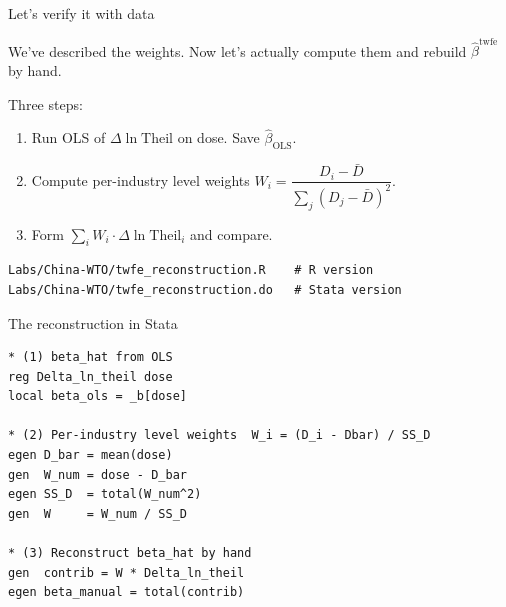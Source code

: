 \documentclass[aspectratio=169,12pt,t]{beamer}
\begin{document}
\begin{frame}[fragile]{Let's verify it with data}
\vspace{0.4em}

We've described the weights. \;Now let's actually compute them and rebuild $\widehat\beta^{\text{twfe}}$ by hand.

\vspace{0.8em}

Three steps:
\begin{enumerate}\setlength\itemsep{0.3em}
  \item Run OLS of $\Delta\ln\text{Theil}$ on dose. \;Save $\widehat\beta_{\text{OLS}}$.
  \item Compute per-industry level weights $W_i = \dfrac{D_i - \bar D}{\sum_j (D_j - \bar D)^2}$.
  \item Form $\sum_i W_i \cdot \Delta\ln\text{Theil}_i$ and compare.
\end{enumerate}

\vspace{0.5em}
\begin{center}
\end{center}

\vspace{0.5em}
\begin{lstlisting}[basicstyle=\ttfamily\tiny\color{warmgray},frame=none,backgroundcolor=\color{white}]
Labs/China-WTO/twfe_reconstruction.R    # R version
Labs/China-WTO/twfe_reconstruction.do   # Stata version
\end{lstlisting}
\end{frame}

\begin{frame}[fragile]{The reconstruction in Stata}
\footnotesize
\begin{lstlisting}[language={[ANSI]C},basicstyle=\ttfamily\scriptsize]
* (1) beta_hat from OLS
reg Delta_ln_theil dose
local beta_ols = _b[dose]

* (2) Per-industry level weights  W_i = (D_i - Dbar) / SS_D
egen D_bar = mean(dose)
gen  W_num = dose - D_bar
egen SS_D  = total(W_num^2)
gen  W     = W_num / SS_D

* (3) Reconstruct beta_hat by hand
gen  contrib = W * Delta_ln_theil
egen beta_manual = total(contrib)
\end{lstlisting}

\vspace{0.4em}
\begin{center}
\end{center}
\end{frame}
\end{document}
